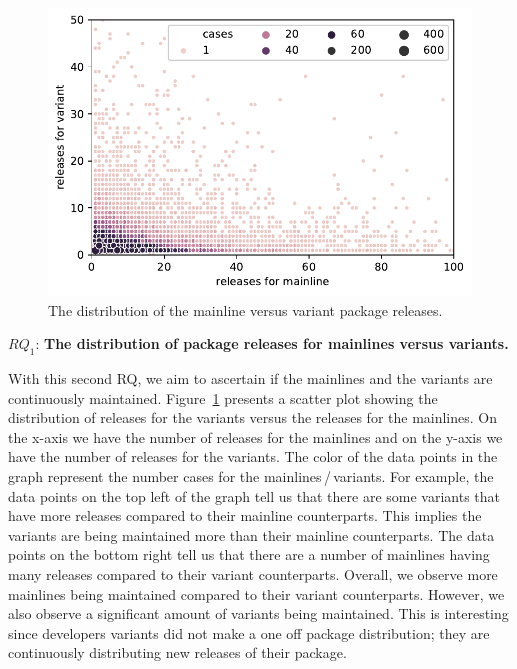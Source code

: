 \begin{figure}[htbp]
\vspace{-.3cm}
   \centering
    \includegraphics[scale=0.6]{figures/benevolj_releases.pdf}
    \caption{The distribution of the mainline versus variant package releases.}
    \label{fig:releases}
\end{figure}


$RQ_1$: \textbf{The distribution of package releases for mainlines versus variants.}

With this second RQ, we aim to ascertain if the mainlines and the variants are continuously maintained. 
Figure~\ref{fig:releases} presents a scatter plot showing the distribution of releases for the variants versus the releases for the mainlines. 
On the x-axis we have the number of releases for the mainlines and on the y-axis we have the number of releases for the variants. 
The color of the data points in the graph represent the number cases for the mainlines\,/\,variants. 
For example, the data points on the top left of the graph tell us that there are some variants that have more releases compared to their mainline counterparts. 
This implies the variants are being maintained more than their mainline counterparts.
The data points on the bottom right tell us that there are a number of mainlines having many releases compared to their variant counterparts. 
Overall, we observe more mainlines being maintained compared to their variant counterparts.
However, we also observe a significant amount of variants being maintained. 
This is interesting since developers variants did not make a one off package distribution; they are continuously distributing new releases of their package. 

